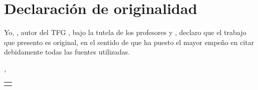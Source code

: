 \chapter*{Declaración de originalidad}
\thispagestyle{empty}
Yo, \myName, autor del TFG \spacedlowsmallcaps{\myTitle}, bajo la tutela de los profesores \myProf y \myOtherProf, declaro que el trabajo que presento es original, en el sentido de que ha puesto el mayor empeño en citar debidamente todas las fuentes utilizadas.

\bigskip

\noindent\textit{\myLocation, \myTime}

\smallskip

\begin{flushright}
	\begin{tabular}{m{5cm}}
		\\ \hline
		\centering\myName \\
	\end{tabular}
\end{flushright}
